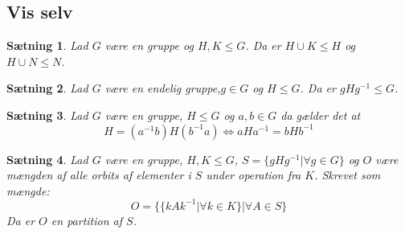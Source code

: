 \documentclass{article}
\newcommand{\inv}{^{-1}}
\newcommand{\biimp}{\Leftrightarrow}
\newtheorem{setn}{Sætning}
\begin{document}
		\subsection*{Vis selv}
		\begin{setn}
			Lad $G$ være en gruppe og $H,K \le G$. Da er $H\cup K \le H$ og $H\cup N \le N$.
		\end{setn}
		\begin{setn} \label{KonjGrup}
			Lad $G$ være en endelig gruppe,$g \in G$ og $H \le G$. Da er $gHg\inv \le G$.
		\end{setn}
		\begin{setn}
			Lad $G$ være en gruppe, $H \le G$ og $a,b \in G$ da gælder det at
			$$H=(a\inv b)H(b\inv a) \biimp aHa\inv = bHb\inv$$
		\end{setn}
		\begin{setn}
			Lad $G$ være en gruppe, $H,K \le G$, $S = \{gHg\inv| \forall g \in G\}$
			og $O$ være mængden af alle orbits af elementer i $S$ under operation fra $K$.
			Skrevet som mængde:
			$$O = \{\{kAk\inv| \forall k \in K\}| \forall A \in S\}$$
			Da er $O$ en partition af $S$.
		\end{setn}
\end{document}
